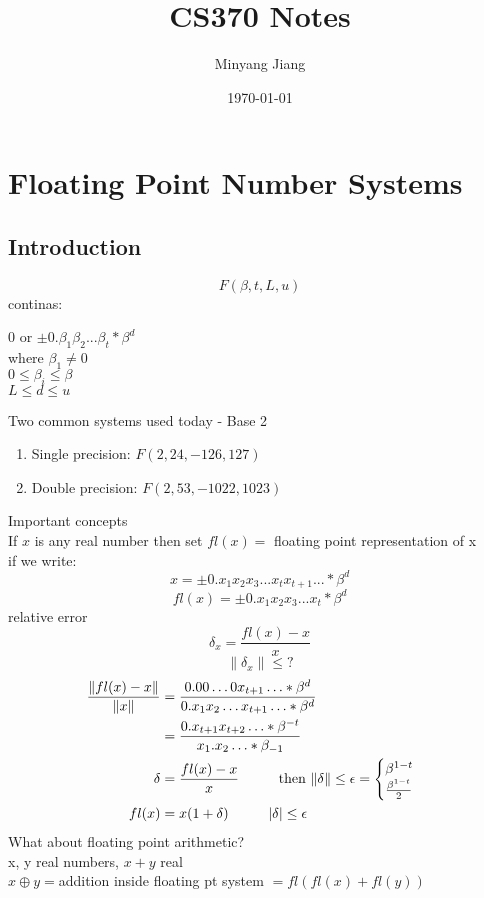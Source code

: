 \documentclass[10pt,usletter]{article}
\title{\huge CS370 Notes}
\author{Minyang Jiang}
\date{\today}
\newcommand{\NP}{\newpage \vspace*{-0.4in}}
\newcommand{\tab}[1][1cm]{\hspace*{#1}}
\begin{document}
\maketitle

\NP
\section{Floating Point Number Systems}
\subsection{Introduction}
$$F(\beta, t, L, u)$$
continas:
\begin{center}
0 or $\pm 0.\beta_1\beta_2...\beta_t * \beta^d$ \\
where $\beta_1 \neq 0$ \\ 
$0 \leq \beta_i \le \beta$ \\
$L \leq d \leq u$
\end{center}
Two common systems used today - Base 2
\begin{enumerate}
\item Single precision: $F(2, 24, -126, 127)$ 
\item Double precision: $F(2, 53, -1022, 1023)$ 
\end{enumerate}
Important concepts\\
If $x$ is any real number then set $fl(x)=$ floating point representation of x \\
if we write: $$x=\pm 0.x_1x_2x_3...x_tx_{t+1}...*\beta^d$$
$$fl(x)=\pm 0.x_1x_2x_3...x_t*\beta^d$$
relative error $$\delta_x = \frac{fl(x)-x}{x}$$
$$\|\delta_x\| \leq ?$$
\begin{align*}
\frac{\|fl(x)-x\|}{\|x\|}&= \frac{0.00\hdots0x_{t+1}\hdots*\beta^d}{0.x_1x_2\hdots x_{t+1}\hdots*\beta^d} \\
&=\frac{0.x_{t+1}x_{t+2}\hdots*\beta^{-t}}{x_1.x_2\hdots * \beta_{-1}}\\
\delta &= \frac{fl(x)-x}{x} \tab \text{then } \|\delta\| \leq \epsilon =
\begin{cases}
\beta^{1-t} \\
\frac{\beta^{1-t}}{2} \
\end{cases}\\
fl(x)&=x(1+\delta) \tab |\delta| \le \epsilon \\
\end{align*}
What about floating point arithmetic? \\
\tab x, y  real numbers, $x+y$ real\\
\tab $x\oplus y = $addition inside floating pt system $=fl(fl(x) + fl(y))$
\end{document}
